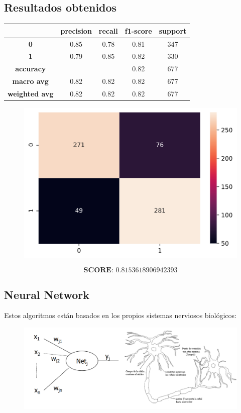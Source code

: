 \documentclass[11pt,a4paper]{article}
\begin{document}
\subsection*{Resultados obtenidos}
\begin{table}[H]
    \centering
    \begin{tabular}{c|cccc}
        \textbf{} & \textbf{precision} & \textbf{recall} & \textbf{f1-score} & \textbf{support} \\ \hline
        \textbf{0} & 0.85 & 0.78 & 0.81 & 347 \\
        \textbf{1} & 0.79 & 0.85 & 0.82 & 330 \\ \hline
        \textbf{accuracy} & & & 0.82 & 677 \\
        \textbf{macro avg} & 0.82 & 0.82 & 0.82 & 677 \\
        \textbf{weighted avg} & 0.82 & 0.82 & 0.82 & 677
    \end{tabular}
\end{table}

\begin{figure}[H]
    \centering
    \includegraphics[scale=0.5]{img/matrix-naivebayes.png}    
\end{figure}
$$\textbf{SCORE:  } 0.8153618906942393$$


\subsection{Neural Network}
Estos algoritmos están basados en los propios sistemas nerviosos biológicos:
\begin{figure}[H]
    \centering
    \includegraphics[scale=0.38]{img/neural-network.png}    
\end{figure}
\end{document}
